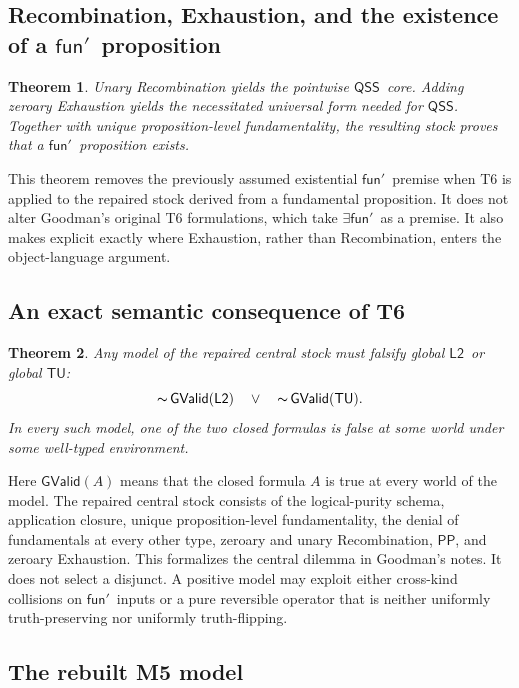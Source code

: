 \documentclass[12pt,leqno]{article}
\newcommand{\OR}{\ensuremath{\vee}}
\newcommand{\NOT}{\ensuremath{\text{$\thicksim$}}}
\theoremstyle{plain}
\newtheorem{theorem}{Theorem}
\theoremstyle{definition}
\newcommand{\funp}{\ensuremath{\mathsf{fun}'\,}}
\newcommand{\PP}{\ensuremath{\mathsf{PP}}}
\newcommand{\Ltwo}{\ensuremath{\mathsf{L2}}}
\newcommand{\QSS}{\ensuremath{\mathsf{QSS}}}
\newcommand{\TU}{\ensuremath{\mathsf{TU}}}
\begin{document}
\subsection{Recombination, Exhaustion, and the existence of a
\texorpdfstring{\(\funp\)}{fun-prime} proposition}

\begin{theorem}
Unary Recombination yields the pointwise \QSS\ core.  Adding zeroary
Exhaustion yields the necessitated universal form needed for \QSS.  Together
with unique proposition-level fundamentality, the resulting stock proves
that a \(\funp\) proposition exists.
\end{theorem}

\noindent
This theorem removes the previously assumed existential \(\funp\) premise
when T6 is applied to the repaired stock derived from a fundamental
proposition.  It does not alter Goodman's original T6 formulations, which
take \(\exists\funp\) as a premise.  It also makes explicit exactly where
Exhaustion, rather than Recombination, enters the object-language argument.

\subsection{An exact semantic consequence of T6}

\begin{theorem}
Any model of the repaired central stock must falsify global \Ltwo\ or global
\TU:
\[
 \NOT\,\mathsf{GValid}(\Ltwo)
 \quad\OR\quad
 \NOT\,\mathsf{GValid}(\TU).
\]
In every such model, one of the two closed formulas is false at some world
under some well-typed environment.
\end{theorem}

\noindent
Here \(\mathsf{GValid}(A)\) means that the closed formula \(A\) is true at
every world of the model.
The repaired central stock consists of the logical-purity schema,
application closure, unique proposition-level fundamentality, the denial of
fundamentals at every other type, zeroary and unary Recombination, \PP, and
zeroary Exhaustion.
This formalizes the central dilemma in Goodman's notes.  It does not select a
disjunct.  A positive model may exploit either cross-kind collisions on
\(\funp\) inputs or a pure reversible operator that is neither uniformly
truth-preserving nor uniformly truth-flipping.

\subsection{The rebuilt M5 model}
\end{document}
